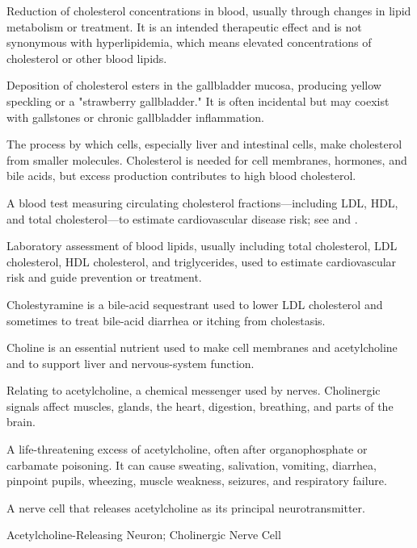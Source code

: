  Reduction of cholesterol concentrations in
blood, usually through changes in lipid metabolism or treatment. It is an
intended therapeutic effect and is not synonymous with hyperlipidemia, which
means elevated concentrations of cholesterol or other blood lipids.

 Deposition of cholesterol esters in the gallbladder mucosa, producing yellow speckling or a "strawberry gallbladder." It is often incidental but may coexist with gallstones or chronic gallbladder inflammation.

 The process by which cells, especially liver and intestinal cells, make cholesterol from smaller molecules. Cholesterol is needed for cell membranes, hormones, and bile acids, but excess production contributes to high blood cholesterol.

 A blood test measuring circulating cholesterol fractions—including LDL, HDL, and total cholesterol—to estimate cardiovascular disease risk; see  and .

 Laboratory assessment of blood lipids, usually including total cholesterol, LDL cholesterol, HDL cholesterol, and triglycerides, used to estimate cardiovascular risk and guide prevention or treatment.

 Cholestyramine is a bile-acid sequestrant used to lower LDL cholesterol and sometimes to treat bile-acid diarrhea or itching from cholestasis.

 Choline is an essential nutrient used to make cell membranes and acetylcholine and to support liver and nervous-system function.

 Relating to acetylcholine, a chemical messenger used by nerves. Cholinergic signals affect muscles, glands, the heart, digestion, breathing, and parts of the brain.

 A life-threatening excess of acetylcholine, often after organophosphate or carbamate poisoning. It can cause sweating, salivation, vomiting, diarrhea, pinpoint pupils, wheezing, muscle weakness, seizures, and respiratory failure.

 A nerve cell that releases acetylcholine as its principal neurotransmitter.

\synonyms
Acetylcholine-Releasing Neuron; Cholinergic Nerve Cell

